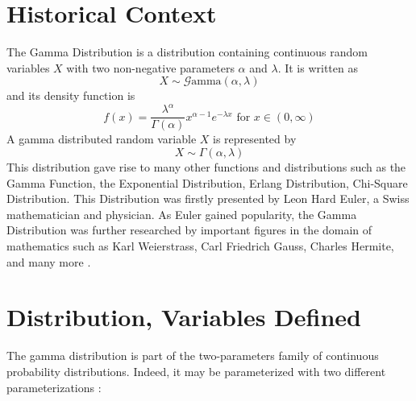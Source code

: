 \documentclass[12pt]{article}
\newcommand{\G}{\mathcal{G}}
\begin{document}
\singlespacing

\tableofcontents\pagebreak
\doublespacing
\section{Historical Context}
The Gamma Distribution is a distribution containing continuous random variables $X$ with two non-negative parameters
$\alpha$ and $\lambda$. It is written as
\begin{equation}
	X\sim\G\text{amma}(\alpha, \lambda)
\end{equation}
and its density function is
\begin{equation}
	f(x)=\frac{\lambda^\alpha}{\Gamma(\alpha)}x^{\alpha-1}e^{-\lambda x}\text{ for }x\in(0,\infty)
\end{equation}
A gamma distributed
random variable $X$ is represented by
\begin{equation}
	X\sim\Gamma(\alpha,\lambda)
\end{equation}
This distribution gave rise to many other functions and distributions such as the Gamma Function, the Exponential
Distribution, Erlang Distribution, Chi-Square Distribution. This Distribution was firstly presented by Leon Hard Euler,
a Swiss mathematician and physician. As Euler gained popularity, the Gamma Distribution was further researched by
important figures in the domain of mathematics such as Karl Weierstrass, Carl Friedrich Gauss, Charles Hermite, and many
more\cite{hoschGammaDistribution2017, wikipediaGammaDistribution2022, sebahIntroductionGammaFunction2002} .


\pagebreak
\section{Distribution, Variables Defined}
The gamma distribution is part of the two-parameters family of continuous probability distributions. Indeed, it may be
parameterized with two different parameterizations\cite{wikipediaGammaDistribution2022} :
\end{document}
